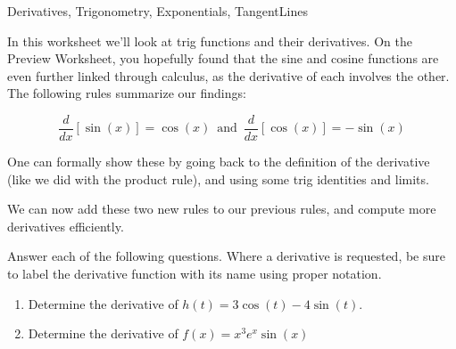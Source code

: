 \begin{tagblock}{Derivatives, Trigonometry, Exponentials, TangentLines}
\begin{question}
	




In this worksheet we'll look at trig functions and their derivatives.  On the Preview Worksheet, you hopefully  found that the sine and cosine functions are  even further linked through calculus, as the derivative of each involves the other. The following rules summarize our findings:
 
\[ \frac{d}{dx}[ \sin(x)] = \cos(x) \, \text{ and }\, \frac{d}{dx}[ \cos(x)] = -\sin(x)\]






One can formally show these by going back to the definition of the derivative (like we did with the product rule), and using some trig identities and limits.  


\bigskip

We can now add these two new rules to our previous rules, and compute more derivatives efficiently.  

\bigskip

Answer each of the following questions. Where a derivative is requested, be sure to label the derivative function with its name using proper notation.

\begin{enumerate}
\item    Determine the derivative of $h(t)=3\cos(t)-4\sin(t)$.  

\vspace{.5in}

\item Determine the derivative of $f(x)=x^3e^x\sin(x)$


\end{enumerate}
\end{question}
\end{tagblock}
